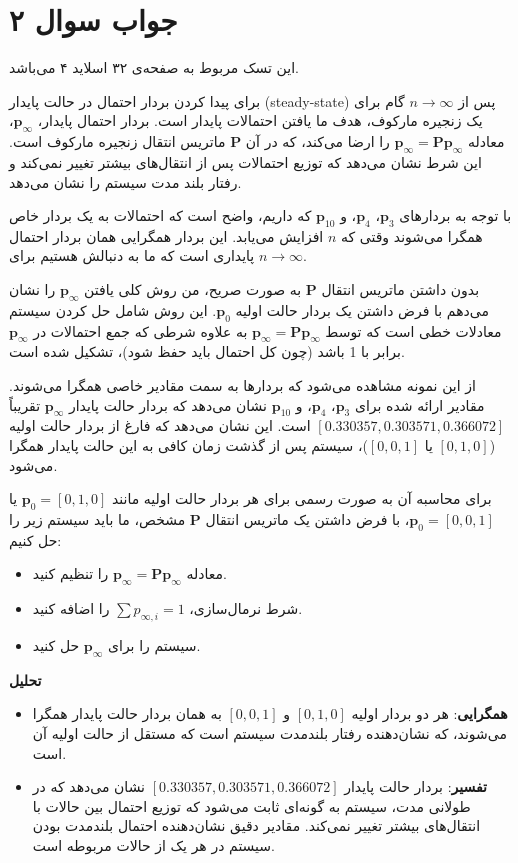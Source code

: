 \section*{جواب سوال ۲}

این تسک مربوط به صفحه‌ی ۳۲ اسلاید ۴ می‌باشد.

برای پیدا کردن بردار احتمال در حالت پایدار (steady-state) پس از \(n \to \infty\) گام برای یک زنجیره مارکوف، هدف ما یافتن احتمالات پایدار است. بردار احتمال پایدار، \(\mathbf{p}_\infty\)، معادله \(\mathbf{p}_\infty = \mathbf{P} \mathbf{p}_\infty\) را ارضا می‌کند، که در آن \(\mathbf{P}\) ماتریس انتقال زنجیره مارکوف است. این شرط نشان می‌دهد که توزیع احتمالات پس از انتقال‌های بیشتر تغییر نمی‌کند و رفتار بلند مدت سیستم را نشان می‌دهد.

با توجه به بردارهای \(\mathbf{p}_3\)، \(\mathbf{p}_4\)، و \(\mathbf{p}_{10}\) که داریم، واضح است که احتمالات به یک بردار خاص همگرا می‌شوند وقتی که \(n\) افزایش می‌یابد. این بردار همگرایی همان بردار احتمال پایداری است که ما به دنبالش هستیم برای \(n \to \infty\).

بدون داشتن ماتریس انتقال \(\mathbf{P}\) به صورت صریح، من روش کلی یافتن \(\mathbf{p}_\infty\) را نشان می‌دهم با فرض داشتن یک بردار حالت اولیه \(\mathbf{p}_0\). این روش شامل حل کردن سیستم معادلات خطی است که توسط \(\mathbf{p}_\infty = \mathbf{P} \mathbf{p}_\infty\) به علاوه شرطی که جمع احتمالات در \(\mathbf{p}_\infty\) برابر با 1 باشد (چون کل احتمال باید حفظ شود)، تشکیل شده است.

از این نمونه مشاهده می‌شود که بردارها به سمت مقادیر خاصی همگرا می‌شوند. مقادیر ارائه شده برای \(\mathbf{p}_{3}\)، \(\mathbf{p}_{4}\)، و \(\mathbf{p}_{10}\) نشان می‌دهد که بردار حالت پایدار \(\mathbf{p}_\infty\) تقریباً \([0.330357, 0.303571, 0.366072]\) است. این نشان می‌دهد که فارغ از بردار حالت اولیه (\([0, 1, 0]\) یا \([0, 0, 1]\))، سیستم پس از گذشت زمان کافی به این حالت پایدار همگرا می‌شود.

برای محاسبه آن به صورت رسمی برای هر بردار حالت اولیه مانند \(\mathbf{p}_0 = [0, 1, 0]\) یا \(\mathbf{p}_0 = [0, 0, 1]\)، با فرض داشتن یک ماتریس انتقال \(\mathbf{P}\) مشخص، ما باید سیستم زیر را حل کنیم:

\begin{itemize}
	\item معادله \(\mathbf{p}_\infty = \mathbf{P} \mathbf{p}_\infty\) را تنظیم کنید.
	\item شرط نرمال‌سازی، \(\sum p_{\infty,i} = 1\) را اضافه کنید.
	\item سیستم را برای \(\mathbf{p}_\infty\) حل کنید.
\end{itemize}

\textbf{تحلیل}

\begin{itemize}
	\item \textbf{همگرایی}: هر دو بردار اولیه \([0, 1, 0]\) و \([0, 0, 1]\) به همان بردار حالت پایدار همگرا می‌شوند، که نشان‌دهنده رفتار بلندمدت سیستم است که مستقل از حالت اولیه آن است.
	\item \textbf{تفسیر}: بردار حالت پایدار \([0.330357, 0.303571, 0.366072]\) نشان می‌دهد که در طولانی مدت، سیستم به گونه‌ای ثابت می‌شود که توزیع احتمال بین حالات با انتقال‌های بیشتر تغییر نمی‌کند. مقادیر دقیق نشان‌دهنده احتمال بلندمدت بودن سیستم در هر یک از حالات مربوطه است.
\end{itemize}
